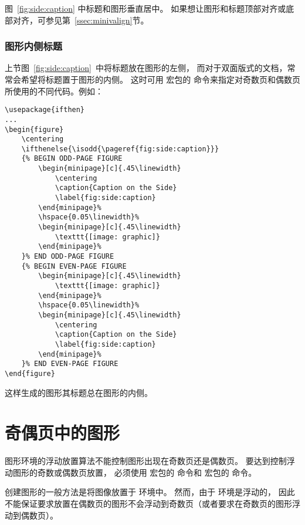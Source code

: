 图~\ref{fig:side:caption} 中标题和图形垂直居中。
如果想让图形和标题顶部对齐或底部对齐，可参见第~\ref{ssec:minivalign}节。

\subsubsection{图形内侧标题}\label{sssec:bindcaption}

上节图~\ref{fig:side:caption}~中将标题放在图形的左侧，
而对于双面版式的文档，常常会希望将标题置于图形的内侧。
这时可用  宏包的  命令来指定对奇数页和偶数页所使用的不同代码。例如：
\begin{lstlisting}
\usepackage{ifthen}
...
\begin{figure}
	\centering
	\ifthenelse{\isodd{\pageref{fig:side:caption}}}
	{% BEGIN ODD-PAGE FIGURE
		\begin{minipage}[c]{.45\linewidth}
			\centering
			\caption{Caption on the Side}
			\label{fig:side:caption}
		\end{minipage}%
		\hspace{0.05\linewidth}%
		\begin{minipage}[c]{.45\linewidth}
			\texttt{[image: graphic]}
		\end{minipage}%
	}% END ODD-PAGE FIGURE
	{% BEGIN EVEN-PAGE FIGURE
		\begin{minipage}[c]{.45\linewidth}
			\texttt{[image: graphic]}
		\end{minipage}%
		\hspace{0.05\linewidth}%
		\begin{minipage}[c]{.45\linewidth}
			\centering
			\caption{Caption on the Side}
			\label{fig:side:caption}
		\end{minipage}%
	}% END EVEN-PAGE FIGURE
\end{figure}
\end{lstlisting}
这样生成的图形其标题总在图形的内侧。


\section{奇偶页中的图形}\label{sec:evenoddpage}

图形环境的浮动放置算法不能控制图形出现在奇数页还是偶数页。
要达到控制浮动图形的奇数或偶数页放置，
必须使用  宏包的  命令和  宏包的  命令。

创建图形的一般方法是将图像放置于  环境中。
然而，由于  环境是浮动的，
因此不能保证要求放置在偶数页的图形不会浮动到奇数页（或者要求在奇数页的图形浮动到偶数页）。

